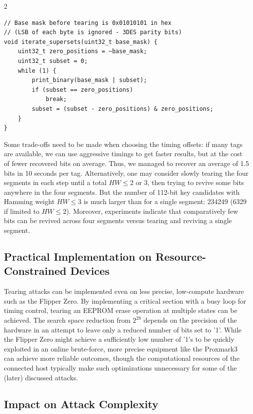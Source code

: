 \documentclass[10pt,letterpaper]{article}
\begin{document}
\begin{multicols}{2}
\begin{lstlisting}[style=customc]
// Base mask before tearing is 0x01010101 in hex 
// (LSB of each byte is ignored - 3DES parity bits)
void iterate_supersets(uint32_t base_mask) {
    uint32_t zero_positions = ~base_mask;
    uint32_t subset = 0;
    while (1) {
        print_binary(base_mask | subset);
        if (subset == zero_positions)
            break;
        subset = (subset - zero_positions) & zero_positions;
    }
}
\end{lstlisting}
Some trade-offs need to be made when choosing the timing offsets: if many tags are available, we can use aggressive timings to get faster results, but at the cost of fewer recovered bits on average. Thus, we managed to recover an average of 1.5 bits in 10 seconds per tag.
Alternatively, one may consider slowly tearing the four segments in each step until a total $HW\leq 2$ or 3, then trying to revive some bits anywhere in the four segments. But the number of 112-bit key candidates with Hamming weight $HW\leq 3$ is much larger than for a single segment: 234249 (6329 if limited to $HW\leq 2$).
Moreover, experiments indicate that comparatively few bits can be revived across four segments versus tearing and reviving a single segment.

\subsection{Practical Implementation on Resource-Constrained Devices}

Tearing attacks can be implemented even on less precise, low-compute hardware such as the Flipper Zero. By implementing a critical section with a busy loop for timing control, tearing an EEPROM erase operation at multiple states can be achieved. The search space reduction from $2^{28}$ depends on the precision of the hardware in an attempt to leave only a reduced number of bits set to '1'. While the Flipper Zero might achieve a sufficiently low number of '1's to be quickly exploited in an online brute-force, more precise equipment like the Proxmark3 can achieve more reliable outcomes, though the computational resources of the connected host typically make such optimizations unnecessary for some of the (later) discussed attacks.

\subsection{Impact on Attack Complexity}


\end{multicols}
\end{document}
